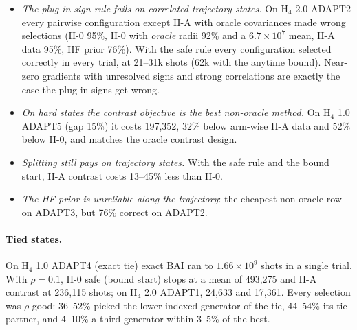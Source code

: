 \documentclass[10.5pt]{article}
\begin{document}
\begin{itemize}
  \item \emph{The plug-in sign rule fails on correlated trajectory states.} On H$_4$ 2.0 ADAPT2 every pairwise configuration except II-A with oracle covariances made wrong selections (II-0 95\%, II-0 with \emph{oracle} radii 92\% and a $6.7\times10^7$ mean, II-A data 95\%, HF prior 76\%). With the safe rule every configuration selected correctly in every trial, at 21--31k shots (62k with the anytime bound). Near-zero gradients with unresolved signs and strong correlations are exactly the case the plug-in signs get wrong.
  \item \emph{On hard states the contrast objective is the best non-oracle method.} On H$_4$ 1.0 ADAPT5 (gap 15\%) it costs 197{,}352, 32\% below arm-wise II-A data and 52\% below II-0, and matches the oracle contrast design.
  \item \emph{Splitting still pays on trajectory states.} With the safe rule and the bound start, II-A contrast costs 13--45\% less than II-0.
  \item \emph{The HF prior is unreliable along the trajectory}: the cheapest non-oracle row on ADAPT3, but 76\% correct on ADAPT2.
\end{itemize}

\paragraph{Tied states.}
On H$_4$ 1.0 ADAPT4 (exact tie) exact BAI ran to $1.66\times10^9$ shots in a single trial. With $\rho=0.1$, II-0 safe (bound start) stops at a mean of 493{,}275 and II-A contrast at 236{,}115 shots; on H$_4$ 2.0 ADAPT1, 24{,}633 and 17{,}361. Every selection was $\rho$-good: 36--52\% picked the lower-indexed generator of the tie, 44--54\% its tie partner, and 4--10\% a third generator within 3--5\% of the best.
\end{document}
